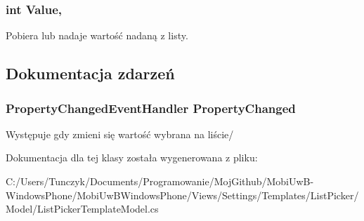 \subsubsection[{Value}]{\setlength{\rightskip}{0pt plus 5cm}int Value\hspace{0.3cm}{\ttfamily [get]}, {\ttfamily [set]}}\label{a00037_aca5c8bf6cfb5ea8d150d4b2f394fd552}


Pobiera lub nadaje wartość nadaną z listy. 



\subsection{Dokumentacja zdarzeń}
\hypertarget{a00037_aa421d817626998e9bcafaf0d70106b7f}{}
\subsubsection[{Property\+Changed}]{\setlength{\rightskip}{0pt plus 5cm}Property\+Changed\+Event\+Handler Property\+Changed}\label{a00037_aa421d817626998e9bcafaf0d70106b7f}


Występuje gdy zmieni się wartość wybrana na liście/ 



Dokumentacja dla tej klasy została wygenerowana z pliku\+:\begin{DoxyCompactItemize}
\item 
C\+:/\+Users/\+Tunczyk/\+Documents/\+Programowanie/\+Moj\+Github/\+Mobi\+Uw\+B-\/\+Windows\+Phone/\+Mobi\+Uw\+B\+Windows\+Phone/\+Views/\+Settings/\+Templates/\+List\+Picker/\+Model/List\+Picker\+Template\+Model.\+cs\end{DoxyCompactItemize}
